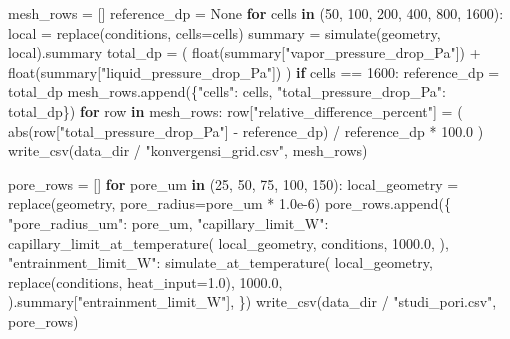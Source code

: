 \documentclass[
  12pt,
  12pt,a4paper,oneside]{report}
\newenvironment{Shaded}{}{}
\newcommand{\BuiltInTok}[1]{\textcolor[rgb]{0.00,0.50,0.00}{#1}}
\newcommand{\ControlFlowTok}[1]{\textcolor[rgb]{0.00,0.44,0.13}{\textbf{#1}}}
\newcommand{\DecValTok}[1]{\textcolor[rgb]{0.25,0.63,0.44}{#1}}
\newcommand{\FloatTok}[1]{\textcolor[rgb]{0.25,0.63,0.44}{#1}}
\newcommand{\KeywordTok}[1]{\textcolor[rgb]{0.00,0.44,0.13}{\textbf{#1}}}
\newcommand{\NormalTok}[1]{#1}
\newcommand{\OperatorTok}[1]{\textcolor[rgb]{0.40,0.40,0.40}{#1}}
\newcommand{\StringTok}[1]{\textcolor[rgb]{0.25,0.44,0.63}{#1}}
\newcommand{\VariableTok}[1]{\textcolor[rgb]{0.10,0.09,0.49}{#1}}
\begin{document}
\begin{Shaded}
\begin{Highlighting}[]
\NormalTok{    mesh\_rows }\OperatorTok{=}\NormalTok{ []}
\NormalTok{    reference\_dp }\OperatorTok{=} \VariableTok{None}
    \ControlFlowTok{for}\NormalTok{ cells }\KeywordTok{in}\NormalTok{ (}\DecValTok{50}\NormalTok{, }\DecValTok{100}\NormalTok{, }\DecValTok{200}\NormalTok{, }\DecValTok{400}\NormalTok{, }\DecValTok{800}\NormalTok{, }\DecValTok{1600}\NormalTok{):}
\NormalTok{        local }\OperatorTok{=}\NormalTok{ replace(conditions, cells}\OperatorTok{=}\NormalTok{cells)}
\NormalTok{        summary }\OperatorTok{=}\NormalTok{ simulate(geometry, local).summary}
\NormalTok{        total\_dp }\OperatorTok{=}\NormalTok{ (}
            \BuiltInTok{float}\NormalTok{(summary[}\StringTok{"vapor\_pressure\_drop\_Pa"}\NormalTok{])}
            \OperatorTok{+} \BuiltInTok{float}\NormalTok{(summary[}\StringTok{"liquid\_pressure\_drop\_Pa"}\NormalTok{])}
\NormalTok{        )}
        \ControlFlowTok{if}\NormalTok{ cells }\OperatorTok{==} \DecValTok{1600}\NormalTok{:}
\NormalTok{            reference\_dp }\OperatorTok{=}\NormalTok{ total\_dp}
\NormalTok{        mesh\_rows.append(\{}\StringTok{"cells"}\NormalTok{: cells, }\StringTok{"total\_pressure\_drop\_Pa"}\NormalTok{: total\_dp\})}
    \ControlFlowTok{for}\NormalTok{ row }\KeywordTok{in}\NormalTok{ mesh\_rows:}
\NormalTok{        row[}\StringTok{"relative\_difference\_percent"}\NormalTok{] }\OperatorTok{=}\NormalTok{ (}
            \BuiltInTok{abs}\NormalTok{(row[}\StringTok{"total\_pressure\_drop\_Pa"}\NormalTok{] }\OperatorTok{{-}}\NormalTok{ reference\_dp)}
            \OperatorTok{/}\NormalTok{ reference\_dp }\OperatorTok{*} \FloatTok{100.0}
\NormalTok{        )}
\NormalTok{    write\_csv(data\_dir }\OperatorTok{/} \StringTok{"konvergensi\_grid.csv"}\NormalTok{, mesh\_rows)}

\NormalTok{    pore\_rows }\OperatorTok{=}\NormalTok{ []}
    \ControlFlowTok{for}\NormalTok{ pore\_um }\KeywordTok{in}\NormalTok{ (}\DecValTok{25}\NormalTok{, }\DecValTok{50}\NormalTok{, }\DecValTok{75}\NormalTok{, }\DecValTok{100}\NormalTok{, }\DecValTok{150}\NormalTok{):}
\NormalTok{        local\_geometry }\OperatorTok{=}\NormalTok{ replace(geometry, pore\_radius}\OperatorTok{=}\NormalTok{pore\_um }\OperatorTok{*} \FloatTok{1.0e{-}6}\NormalTok{)}
\NormalTok{        pore\_rows.append(\{}
            \StringTok{"pore\_radius\_um"}\NormalTok{: pore\_um,}
            \StringTok{"capillary\_limit\_W"}\NormalTok{: capillary\_limit\_at\_temperature(}
\NormalTok{                local\_geometry, conditions, }\FloatTok{1000.0}\NormalTok{,}
\NormalTok{            ),}
            \StringTok{"entrainment\_limit\_W"}\NormalTok{: simulate\_at\_temperature(}
\NormalTok{                local\_geometry, replace(conditions, heat\_input}\OperatorTok{=}\FloatTok{1.0}\NormalTok{), }\FloatTok{1000.0}\NormalTok{,}
\NormalTok{            ).summary[}\StringTok{"entrainment\_limit\_W"}\NormalTok{],}
\NormalTok{        \})}
\NormalTok{    write\_csv(data\_dir }\OperatorTok{/} \StringTok{"studi\_pori.csv"}\NormalTok{, pore\_rows)}


\end{Highlighting}
\end{Shaded}
\end{document}
